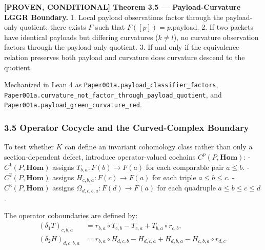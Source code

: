 \documentclass[
  english,
  10pt,
  a4paper,
]{article}
\renewenvironment{quote}
  {\begin{leftbar}\small}
  {\end{leftbar}}
\begin{document}
\begin{quote}
\textbf{{[}PROVEN, CONDITIONAL{]} Theorem 3.5 --- Payload-Curvature LGGR
Boundary.} 1. Local payload observations factor through the payload-only
quotient: there exists \(F\) such that \(F([p]) = p.\mathrm{payload}\).
2. If two packets have identical payloads but differing curvatures
(\(k\ne l\)), no curvature observation factors through the payload-only
quotient. 3. If and only if the equivalence relation preserves both
payload and curvature does curvature descend to the quotient.
\end{quote}

Mechanized in Lean 4 as
\nolinkurl{Paper001a.payload_classifier_factors},
\nolinkurl{Paper001a.curvature_not_factor_through_payload_quotient}, and
\nolinkurl{Paper001a.payload_green_curvature_red}.

\subsubsection{3.5 Operator Cocycle and the Curved-Complex
Boundary}\label{operator-cocycle-and-the-curved-complex-boundary}

To test whether \(K\) can define an invariant cohomology class rather
than only a section-dependent defect, introduce operator-valued cochains
\(C^p(P, \mathbf{Hom})\): - \(C^1(P, \mathbf{Hom})\) assigns
\(T_{b,a}: F(b) \to F(a)\) for each comparable pair \(a \le b\). -
\(C^2(P, \mathbf{Hom})\) assigns \(H_{c,b,a}: F(c) \to F(a)\) for each
triple \(a \le b \le c\). - \(C^3(P, \mathbf{Hom})\) assigns
\(\Omega_{d,c,b,a}: F(d) \to F(a)\) for each quadruple
\(a \le b \le c \le d\).

The operator coboundaries are defined by: \[
\begin{aligned}
(\delta_1 T)_{c,b,a} &= r_{b,a} \circ T_{c,b} - T_{c,a} + T_{b,a} \circ r_{c,b}, \\
(\delta_2 H)_{d,c,b,a} &= r_{b,a} \circ H_{d,c,b} - H_{d,c,a} + H_{d,b,a} - H_{c,b,a} \circ r_{d,c}.
\end{aligned}
\]
\end{document}
